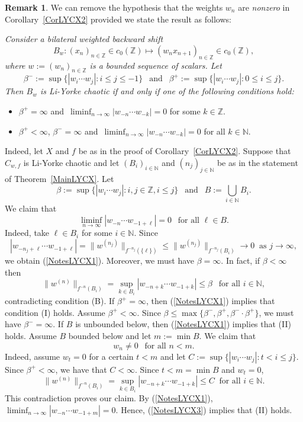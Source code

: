 \documentclass[12pt]{amsart}
\theoremstyle{theorem}
\theoremstyle{definition}
\newtheorem{remark}[theorem]{Remark}
\theoremstyle{remark} \theoremstyle{question} \theoremstyle{example}
\newcommand{\N}{\mathbb{N}}
\newcommand{\Z}{\mathbb{Z}}
\begin{document}
\begin{remark}\label{RemarkLYCX}
We can remove the hypothesis that the weights $w_n$ are {\em nonzero} in Corollary~\ref{CorLYCX2} provided we state the result as follows: 
{\it Consider a bilateral weighted backward shift
\[
B_w : (x_n)_{n \in \Z} \in c_0(\Z) \mapsto (w_n x_{n+1})_{n \in \Z} \in c_0(\Z),
\]
where $w\!:= (w_n)_{n \in \Z}$ is a bounded sequence of scalars. Let
\[
\beta^-\!:= \sup\{|w_i \cdots w_j| : i \leq j \leq -1\} \ \ \text{ and } \ \ \beta^+\!:= \sup\{|w_i \cdots w_j| : 0 \leq i \leq j\}.
\]
Then $B_w$ is Li-Yorke chaotic if and only if one of the following conditions hold:
\begin{itemize}
\item [\rm (I)]  $\beta^+ = \infty$ and $\,\displaystyle \liminf_{n \to \infty} |w_{-n} \cdots w_{-k}| = 0$ for some $k \in \Z$.
\item [\rm (II)] $\beta^+ < \infty$, $\beta^- = \infty$ and $\,\displaystyle \liminf_{n \to \infty} |w_{-n} \cdots w_{-k}| = 0$ for all $k \in \N$.
\end{itemize}}

Indeed, let $X$ and $f$ be as in the proof of Corollary~\ref{CorLYCX2}. Suppose that $C_{w,f}$ is Li-Yorke chaotic and let 
$(B_i)_{i \in \N}$ and $(n_j)_{j \in \N}$ be as in the statement of Theorem~\ref{MainLYCX}. Let 
\[
\beta\!:= \sup\{|w_i \cdots w_j| : i,j \in \Z, i \leq j\} \ \ \text{ and } \ \ B\!:= \bigcup_{i \in \N} B_i.
\]
We claim that
\begin{equation}\label{NotesLYCX1}
\liminf_{n \to \infty} |w_{-n} \cdots w_{-1 + \ell}| = 0 \ \ \text{ for all } \ell \in B.
\end{equation}
Indeed, take $\ell \in B_i$ for some $i \in \N$. Since
\[
|w_{-n_j + \ell} \cdots w_{-1 + \ell}| = \|w^{(n_j)}\|_{f^{-n_j}(\{\ell\})} \leq \|w^{(n_j)}\|_{f^{-n_j}(B_i)} \to 0 \ \text{ as } j \to \infty,
\]
we obtain (\ref{NotesLYCX1}). Moreover, we must have $\beta = \infty$. In fact, if $\beta < \infty$ then 
\[
\|w^{(n)}\|_{f^{-n}(B_i)} = \sup_{k \in B_i} |w_{-n+k} \cdots w_{-1+k}| \leq \beta \ \ \text{ for all } i \in \N,
\]
contradicting condition (B). If $\beta^+ = \infty$, then (\ref{NotesLYCX1}) implies that condition (I) holds.
Assume $\beta^+ < \infty$. Since $\beta \leq \max\{\beta^-, \beta^+, \beta^- \!\!\cdot\! \beta^+\}$, we must have $\beta^- = \infty$. 
If $B$ is unbounded below, then (\ref{NotesLYCX1}) implies that (II) holds. Assume $B$ bounded below and let $m\!:= \min B$. 
We claim that
\begin{equation}\label{NotesLYCX3}
w_n \neq 0 \ \ \text{ for all } n < m.
\end{equation}
Indeed, assume $w_t = 0$ for a certain $t < m$ and let $C\!:= \sup\{|w_i \cdots w_j| : t < i \leq j\}$.
Since $\beta^+ < \infty$, we have that $C < \infty$. Since $t < m = \min B$ and $w_t = 0$,
\[
\|w^{(n)}\|_{f^{-n}(B_i)} = \sup_{k \in B_i} |w_{-n+k} \cdots w_{-1+k}| \leq C \ \text{ for all } i \in \N.
\]
This contradiction proves our claim. By (\ref{NotesLYCX1}), $\liminf_{n \to \infty} |w_{-n} \cdots w_{-1 + m}| = 0$.
Hence, (\ref{NotesLYCX3}) implies that (II) holds.


\end{remark}
\end{document}
